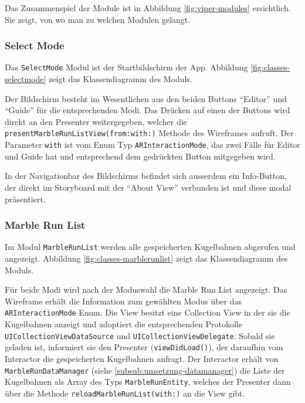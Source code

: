 Das Zusammenspiel der Module ist in Abbildung \ref{fig:viper-modules} ersichtlich.
Sie zeigt, von wo man zu welchen Modulen gelangt.


\subsubsection{Select Mode} \label{subsub:umsetzung-modul-selectmode}

Das \texttt{SelectMode} Modul ist der Startbildschirm der App.
Abbildung \ref{fig:classes-selectmode} zeigt das Klassendiagramm des Moduls.


Der Bildschirm besteht im Wesentlichen aus den beiden Buttons "`Editor"' und "`Guide"' für die entsprechenden Modi.
Das Drücken auf einen der Buttons wird direkt an den Presenter weitergegeben, welcher die \texttt{presentMarbleRunListView(from:with:)} Methode des Wireframes aufruft.
Der Parameter \texttt{with} ist vom Enum Typ \texttt{ARInteractionMode}, das zwei Fälle für Editor und Guide hat und entsprechend dem gedrückten Button mitgegeben wird.

In der Navigationbar des Bildschirms befindet sich ausserdem ein Info-Button, der direkt im Storyboard mit der "`About View"' verbunden ist und diese modal präsentiert. %

\subsubsection{Marble Run List} \label{subsub:umsetzung-modul-marblerunlist}

Im Modul \texttt{MarbleRunList} werden alle gespeicherten Kugelbahnen abgerufen und angezeigt.
Abbildung \ref{fig:classes-marblerunlist} zeigt das Klassendiagramm des Moduls.


Für beide Modi wird nach der Moduswahl die Marble Run List angezeigt.
Das Wireframe erhält die Information zum gewählten Modus über das \texttt{ARInteractionMode} Enum.
Die View besitzt eine Collection View in der sie die Kugelbahnen anzeigt und adoptiert die entsprechenden Protokolle \texttt{UICollectionViewDataSource} und \texttt{UICollectionViewDelegate}.
Sobald sie geladen ist, informiert sie den Presenter (\texttt{viewDidLoad()}), der daraufhin vom Interactor die gespeicherten Kugelbahnen anfragt.
Der Interactor erhält von \texttt{MarbleRunDataManager} (siehe \ref{subsub:umsetzung-datamanager}) die Liste der Kugelbahnen als Array des Typs \texttt{MarbleRunEntity}, welches der Presenter dann über die Methode \texttt{reloadMarbleRunList(with:)} an die View gibt.

